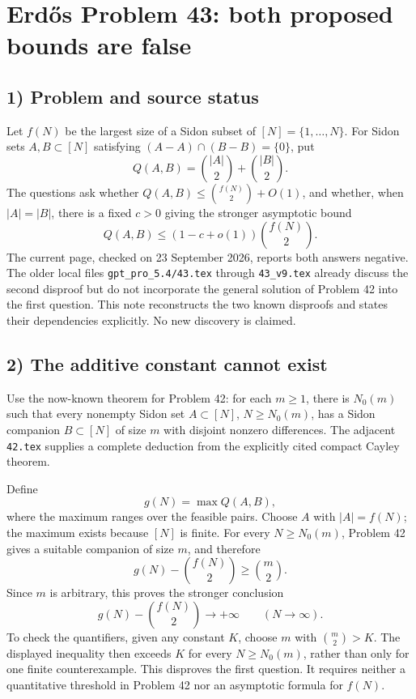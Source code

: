 \section{Erd\H{o}s Problem 43: both proposed bounds are false}

\subsection{1) Problem and source status}
Let $f(N)$ be the largest size of a Sidon subset of $[N]=\{1,\ldots,N\}$.
For Sidon sets $A,B\subset[N]$ satisfying
$(A-A)\cap(B-B)=\{0\}$, put
\[
 Q(A,B)=\binom{|A|}{2}+\binom{|B|}{2}.
\]
The questions ask whether $Q(A,B)\leq\binom{f(N)}2+O(1)$, and whether,
when $|A|=|B|$, there is a fixed $c>0$ giving the stronger asymptotic bound
\[
 Q(A,B)\leq(1-c+o(1))\binom{f(N)}2.
\]
The current page, checked on 23 September 2026, reports both answers
negative. The older local files \texttt{gpt\_pro\_5.4/43.tex} through
\texttt{43\_v9.tex} already discuss the second disproof but do not
incorporate the general solution of Problem 42 into the first question.
This note reconstructs the two known disproofs and states their
dependencies explicitly. No new discovery is claimed.

\subsection{2) The additive constant cannot exist}
Use the now-known theorem for Problem 42: for each $m\geq1$, there is
$N_0(m)$ such that every nonempty Sidon set $A\subset[N]$, $N\geq N_0(m)$,
has a Sidon companion $B\subset[N]$ of size $m$ with disjoint nonzero
differences. The adjacent \texttt{42.tex} supplies a complete deduction
from the explicitly cited compact Cayley theorem.

Define
\[
 g(N)=\max Q(A,B),
\]
where the maximum ranges over the feasible pairs. Choose $A$ with
$|A|=f(N)$; the maximum exists because $[N]$ is finite. For every
$N\geq N_0(m)$, Problem 42 gives a suitable companion of size $m$, and
therefore
\[
 g(N)-\binom{f(N)}2\geq\binom m2.
\]
Since $m$ is arbitrary, this proves the stronger conclusion
\[
 g(N)-\binom{f(N)}2\longrightarrow+\infty\qquad(N\to\infty).
\]
To check the quantifiers, given any constant $K$, choose $m$ with
$\binom m2>K$. The displayed inequality then exceeds $K$ for every
$N\geq N_0(m)$, rather than only for one finite counterexample.
This disproves the first question. It requires neither a quantitative
threshold in Problem 42 nor an asymptotic formula for $f(N)$.

